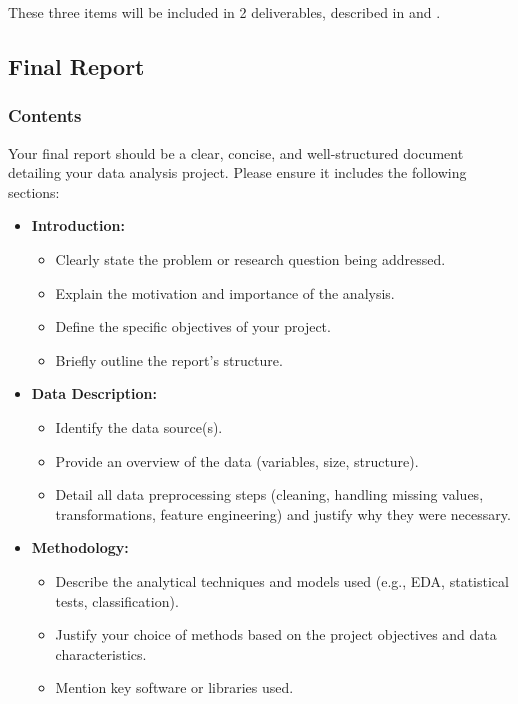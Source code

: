 \documentclass[11pt]{exam}
\begin{document}
    These three items will be included in 2 deliverables, described in  and .

    \subsection{Final Report}
    \label{subsec:report}
    \subsubsection{Contents}
    Your final report should be a clear, concise, and well-structured document detailing your data analysis project. Please ensure it includes the following sections:

    \begin{itemize}
        \item \textbf{Introduction:}
        \begin{itemize}
            \item Clearly state the problem or research question being addressed.
            \item Explain the motivation and importance of the analysis.
            \item Define the specific objectives of your project.
            \item Briefly outline the report's structure.
        \end{itemize}

        \item \textbf{Data Description:}
        \begin{itemize}
            \item Identify the data source(s).
            \item Provide an overview of the data (variables, size, structure).
            \item Detail all data preprocessing steps (cleaning, handling missing values, transformations, feature engineering) and justify why they were necessary.
        \end{itemize}

        \item \textbf{Methodology:}
        \begin{itemize}
            \item Describe the analytical techniques and models used (e.g., EDA, statistical tests, classification).
            \item Justify your choice of methods based on the project objectives and data characteristics.
            \item Mention key software or libraries used. %
        \end{itemize}


\end{itemize}
\end{document}
